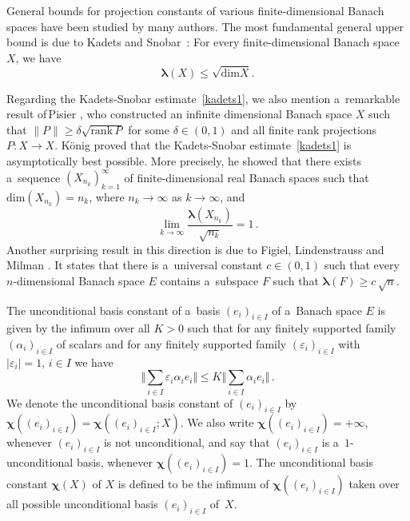 \documentclass[12pt]{amsart}
\numberwithin{subsection}{section}
\theoremstyle{definition}
\theoremstyle{remark}
\begin{document}
General bounds for projection constants of various finite-dimensional Banach spaces have been studied by many authors. The most
fundamental general upper bound is due to Kadets and Snobar~\cite{kadecsnobar}: For every finite-dimensional Banach space $X$,
we have
\begin{equation} \label{kadets1}
\boldsymbol{\lambda}(X) \leq \sqrt{\text{dim}X}.
\end{equation}

Regarding the Kadets-Snobar estimate~\eqref{kadets1}, we also mention a~remarkable result of\,Pisier
\cite[Corollary 10.8]{pisier1986factorization}, who constructed an infinite dimensional Banach space $X$ such that $\|P\| \geq \delta \sqrt{\text{rank}\,P}$ for some
$\delta \in (0, 1)$ and all  finite rank projections $P\colon X \to X$.
K\"onig \cite{konig1985spaces} proved that the Kadets-Snobar estimate~\eqref{kadets1} is asymptotically  best possible. More
precisely, he showed that there exists a~sequence $(X_{n_k})_{k=1}^{\infty}$ of finite-dimensional real Banach spaces such
that $\text{dim}(X_{n_k}) = n_k$, where $n_k\to \infty$ as $k\to \infty$, and
\[
\lim_{k\to \infty} \frac{\boldsymbol{\lambda}(X_{n_k})}{\sqrt{n_k}} = 1\,.
\]
Another surprising result in this direction is due to Figiel, Lindenstrauss and Milman \cite{FLM}. It states that there is
a~universal constant $c\in (0, 1)$ such that every $n$-dimensional Banach space $E$ contains a~subspace $F$ such that
$\boldsymbol{\lambda}(F) \geq c\,\sqrt{n}$.


The unconditional basis constant of a~basis $(e_i)_{i \in I}$ of a~Banach space $E$ is given by the infimum over all $K > 0$
such that for any finitely supported family $(\alpha_i)_{i \in I}$ of scalars and for any finitely supported family
$(\varepsilon_i)_{i \in I}$ with $|\varepsilon_i| =1, \,  i \in I$ we have
\begin{equation*}\label{unconditionality}
\Big\Vert  \sum_{i \in I} \varepsilon_i \alpha_i e_i \Big\Vert \leq K \Big\Vert \sum_{i \in I} \alpha_i e_i \Big\Vert\,.
\end{equation*}
We denote the unconditional basis constant of $(e_i)_{i\in I}$ by
$\boldsymbol{\chi}((e_i)_{i\in I})= \boldsymbol{\chi}((e_i)_{i\in I}; X)$. We also write  $\boldsymbol{\chi}((e_i)_{i \in I})
= +\infty$, whenever $(e_i)_{i\in I}$ is not unconditional, and say that $(e_i)_{i\in I}$ is a~$1$-unconditional basis, whenever
$\boldsymbol{\chi}((e_i)_{i\in I}) =1$. The unconditional basis constant $\boldsymbol{\chi}(X)$ of $X$ is defined to be the
infimum of $\boldsymbol{\chi}((e_i)_{i\in I})$ taken over all possible unconditional basis $(e_i)_{i\in I}$ of~$X$.
\end{document}
